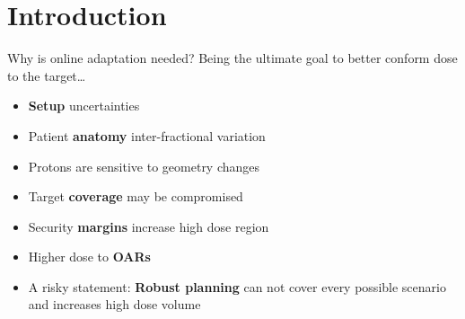 \section{Introduction}

\begin{frame}[c]{Why is online adaptation needed?}
    Being the ultimate goal to better conform dose to the target\ldots
    \begin{itemize}
        \item<1-> \textbf{Setup} uncertainties
        \item<1-> Patient \textbf{anatomy} inter-fractional variation
        \item<2-> Protons are sensitive to geometry changes
        \item<2-> Target \textbf{coverage} may be compromised
        \item<3-> Security \textbf{margins} increase high dose region
        \item<4-> Higher dose to \textbf{OARs}
        \item<5-> A risky statement: \textbf{Robust planning} can not cover every possible scenario and increases high dose volume
    \end{itemize}
\end{frame}


